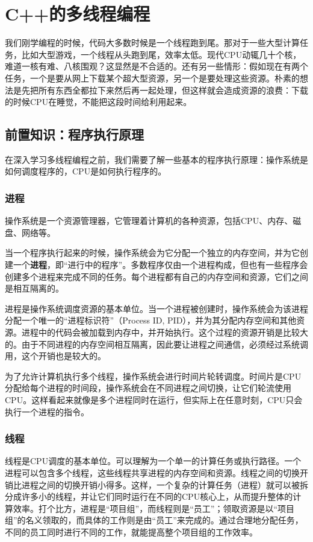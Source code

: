 \chapter{C++的多线程编程}

我们刚学编程的时候，代码大多数时候是一个线程跑到尾。那对于一些大型计算任务，比如大型游戏，一个线程从头跑到尾，效率太低。现代CPU动辄几十个核，难道一核有难、八核围观？这显然是不合适的。还有另一些情形：假如现在有两个任务，一个是要从网上下载某个超大型资源，另一个是要处理这些资源。朴素的想法是先把所有东西全都拉下来然后再一起处理，但这样就会造成资源的浪费：下载的时候CPU在睡觉，不能把这段时间给利用起来。

\section{前置知识：程序执行原理}

在深入学习多线程编程之前，我们需要了解一些基本的程序执行原理：操作系统是如何调度程序的，CPU是如何执行程序的。

\subsection{进程}

操作系统是一个资源管理器，它管理着计算机的各种资源，包括CPU、内存、磁盘、网络等。

当一个程序执行起来的时候，操作系统会为它分配一个独立的内存空间，并为它创建一个\textbf{进程}，即“进行中的程序”。多数程序仅由一个进程构成，但也有一些程序会创建多个进程来完成不同的任务。每个进程都有自己的内存空间和资源，它们之间是相互隔离的。

进程是操作系统调度资源的基本单位。当一个进程被创建时，操作系统会为该进程分配一个唯一的“进程标识符”（Process ID, PID），并为其分配内存空间和其他资源。进程中的代码会被加载到内存中，并开始执行。这个过程的资源开销是比较大的。由于不同进程的内存空间相互隔离，因此要让进程之间通信，必须经过系统调用，这个开销也是较大的。

为了允许计算机执行多个线程，操作系统会进行时间片轮转调度。时间片是CPU分配给每个进程的时间段，操作系统会在不同进程之间切换，让它们轮流使用CPU。这样看起来就像是多个进程同时在运行，但实际上在任意时刻，CPU只会执行一个进程的指令。

\subsection{线程}

线程是CPU调度的基本单位。可以理解为一个单一的计算任务或执行路径。一个进程可以包含多个线程，这些线程共享进程的内存空间和资源。线程之间的切换开销比进程之间的切换开销小得多。这样，一个复杂的计算任务（进程）就可以被拆分成许多小的线程，并让它们同时运行在不同的CPU核心上，从而提升整体的计算效率。打个比方，进程是“项目组”，而线程则是“员工”；领取资源是以“项目组”的名义领取的，而具体的工作则是由“员工”来完成的。通过合理地分配任务，不同的员工同时进行不同的工作，就能提高整个项目组的工作效率。

